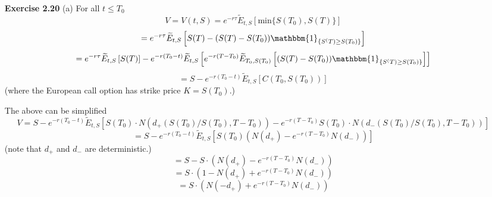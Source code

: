 \documentclass{article}[12pt,a4paper]
\begin{document}
\begin{enumerate}
  (b)
  $$\lim_{T_1 \rightarrow t}{C(t, S; T_1, T)} = 
  \lim_{T_1 \rightarrow t}{ S \cdot (e^{-q\tau_1}N(d_+^*(1/\alpha, \tau_1)) - \alpha e^{-r\tau_1} N(d_-^*(1/\alpha, \tau_1)))}$$
  $$= \lim_{\tau_1 \rightarrow \tau}{ S \cdot (e^{-q\tau_1}N(d_+^*(1/\alpha, \tau_1)) - \alpha e^{-r\tau_1} 
  N(d_-^*(1/\alpha, \tau_1)))}$$
  $$= Se^{-q\tau}N(d_+^*(1/\alpha, \tau)) - \alpha S e^{-r\tau} N(d_-^*(1/\alpha, \tau))$$
 
  This is in fact the price of a European call option with strike $K = \alpha S$. \newline
   $$\lim_{T_1 \rightarrow T}{C(t, S; T_1, T)} = 
   \lim_{T_1 \rightarrow T}{ S \cdot (e^{-q\tau_1}N(d_+^*(1/\alpha, \tau_1)) - \alpha e^{-r\tau_1} N(d_-^*(1/\alpha, \tau_1)))}$$
   $$= \lim_{\tau_1 \rightarrow 0}{ S \cdot (e^{-q\tau_1}N(d_+^*(1/\alpha, \tau_1)) - \alpha e^{-r\tau_1} N(d_-^*(1/\alpha, \tau_1)))}$$
   $$= \lim_{\tau_1 \rightarrow 0}{ S \cdot (N(d_+^*(1/\alpha, \tau_1)) - \alpha N(d_-^*(1/\alpha, \tau_1)))}$$
   $$= \lim_{\tau_1 \rightarrow 0}{ S \cdot (N(-ln(\alpha)/\tau_1) - \alpha N(-ln(\alpha)/\tau_1))} = S\cdot(1 - \alpha)^+$$
   (Some unnecessary terms ommitted on the last line. The key point is that the Normal CDF values go to $0$ if
    $\alpha >= 1 \mbox{ } (\Rightarrow -ln(\alpha) < 0)$ and go to $1$ if $\alpha < 1 \mbox{ } (\Rightarrow -ln(\alpha) > 0)$.)
   
  \pagebreak
  \item[\textbf{Exercise 2.20}]
  (a)
  For all $t \le T_0$
  $$V = V(t, S) = e^{-r\tau}\widetilde{E}_{t,S}\left[ \mbox{min}\{S(T_0),S(T)\} \right]$$ 
  $$= e^{-r\tau}\widetilde{E}_{t,S}\left[ S(T) - (S(T) - S(T_0)) \mathbbm{1}_{\{ S^(T) \ge S(T_0) \}} \right]$$
  $$= e^{-r\tau}\widetilde{E}_{t,S}\left[S(T)\right] - e^{-r(T_0 - t)}
  \widetilde{E}_{t,S}\left[e^{-r(T - T_0)}\widetilde{E}_{T_0,S(T_0)}
  \left[(S(T) - S(T_0)) \mathbbm{1}_{\{ S^(T) \ge S(T_0) \}}\right]\right]$$
  $$= S - e^{-r(T_0 - t)} \widetilde{E}_{t,S}\left[ C(T_0, S(T_0)) \right]$$
  \hfill (where the European call option has strike price $K = S(T_0)$.) \newline
  
  The above can be simplified
  $$V = S -  e^{-r(T_0 - t)} \widetilde{E}_{t,S}\left[ 
      S(T_0) \cdot N(d_+(S(T_0)/S(T_0), T - T_0)) - e^{-r(T - T_0)}S(T_0)  \cdot N(d_-(S(T_0)/S(T_0), T - T_0)) \right]$$
 $$= S -  e^{-r(T_0 - t)} \widetilde{E}_{t,S}\left[ S(T_0)(N(d_+) - e^{-r(T - T_0)}N(d_-)) \right]$$
  \hfill (note that $d_+$ and $d_-$ are deterministic.)
  $$= S - S\cdot (N(d_+) - e^{-r(T - T_0)}N(d_-))$$ 
  $$= S\cdot(1 - N(d_+) + e^{-r(T - T_0)}N(d_-)) $$
  $$= S \cdot (N(-d_+) + e^{-r(T - T_0)}N(d_-))$$ \newline
  

\end{enumerate}
\end{document}
